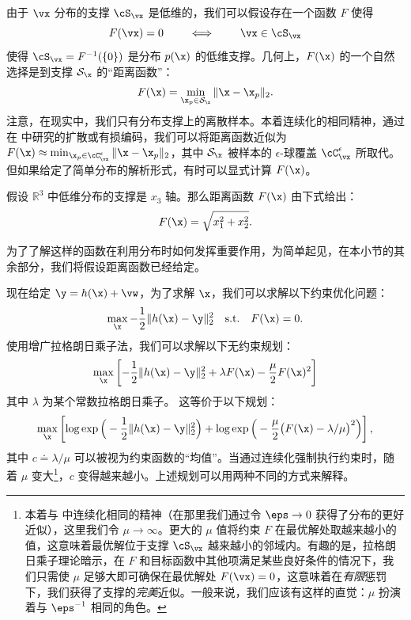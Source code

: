 \documentclass[../../book-main_zh.tex]{subfiles}
\begin{document}
由于 \(\vx\) 分布的支撑 \(\cS_{\vx}\) 是低维的，我们可以假设存在一个函数 \(F\) 使得
\begin{equation}
    F(\vx) = {0} \qquad \iff \qquad \vx \in \cS_{\vx}
\end{equation}
使得 \(\cS_{\vx} = F^{-1}(\{0\})\) 是分布 $p(\x)$ 的低维支撑。几何上，$F(\x)$ 的一个自然选择是到支撑 $\mathcal{S}_{\x}$ 的“距离函数”：
\begin{equation}
    F(\x) = \min_{\x_p \in \mathcal{S}_{\x}} \|\x - \x_p\|_2.
    \label{eqn:F-definition}
\end{equation}
注意，在现实中，我们只有分布支撑上的离散样本。本着连续化的相同精神，通过在  中研究的扩散或有损编码，我们可以将距离函数近似为 $F(\x) \approx \min_{\x_p \in \cC_{\vx}^{\epsilon}} \|\x - \x_p\|_2$，其中 $\mathcal{S}_{\x}$ 被样本的 $\epsilon$-球覆盖 \(\cC_{\vx}^{\epsilon}\) 所取代。但如果给定了简单分布的解析形式，有时可以显式计算 $F(\x)$。
\begin{example}
    假设 $\mathbb{R}^3$ 中低维分布的支撑是 $x_3$ 轴。那么距离函数 $F(\x)$ 由下式给出：
    \begin{equation}
        F(\x) = \sqrt{x_1^2 + x_2^2}.
    \end{equation}
    \label{eg:distance-line}
\end{example}
为了了解这样的函数在利用分布时如何发挥重要作用，为简单起见，在本小节的其余部分，我们将假设距离函数已经给定。

现在给定 $\y = h(\x) +\vw$，为了求解 $\x$，我们可以求解以下约束优化问题：
\begin{equation}
    \max_{\x} - \frac{1}{2}\|h(\x) - \y\|_2^2 \quad \text{s.t.} \quad
    F(\x) = {0}.
\end{equation}
使用增广拉格朗日乘子法，我们可以求解以下无约束规划：
\begin{equation}
    \max_{\x} \left[-\frac{1}{2}\|h(\x) - \y\|_2^2  + \lambda F(\x) -
    \frac{\mu}{2} F(\x)^2\right]
\end{equation}
其中 $\lambda$ 为某个常数拉格朗日乘子。
这等价于以下规划：
\begin{equation}\label{eq:lagrange_multiplier_continuation}
    \max_{\x} \left[\log \exp\Big(- \frac{1}{2}\|h(\x) -
        \y\|_2^2\Big) + \log \exp\Big( - \frac{\mu}{2} \big(F(\x) -
    \lambda/\mu\big)^2\Big)\right],
\end{equation}
其中 $c \doteq {\lambda}/{\mu}$ 可以被视为约束函数的“均值”。当通过连续化强制执行约束时，随着 $\mu$ 变大\footnote{本着与  中连续化相同的精神（在那里我们通过令 \(\eps \to 0\) 获得了分布的更好近似），这里我们令 \(\mu \to \infty\)。更大的 \(\mu\) 值将约束 \(F\) 在最优解处取越来越小的值，这意味着最优解位于支撑 \(\cS_{\vx}\) 越来越小的邻域内。有趣的是，拉格朗日乘子理论暗示，在 \(F\) 和目标函数中其他项满足某些良好条件的情况下，我们只需使 \(\mu\) 足够大即可确保在最优解处 \(F(\vx) = 0\)，这意味着在\textit{有限}惩罚下，我们获得了支撑的\textit{完美}近似。一般来说，我们应该有这样的直觉：\(\mu\) 扮演着与 \(\eps^{-1}\) 相同的角色。}，$c$ 变得越来越小。上述规划可以用两种不同的方式来解释。
\end{document}
